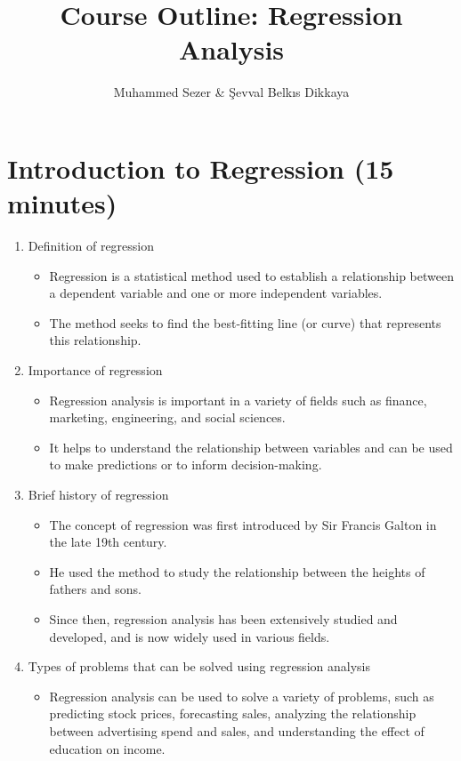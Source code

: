 \documentclass{article}
\begin{document}
\title{Course Outline: Regression Analysis}
\author{Muhammed Sezer \& Şevval Belkıs Dikkaya}
\date{}

\maketitle

\section{Introduction to Regression (15 minutes)}
\begin{enumerate}[label=\alph*)]
\item Definition of regression
\begin{itemize}
\item Regression is a statistical method used to establish a relationship between a dependent variable and one or more independent variables.
\item The method seeks to find the best-fitting line (or curve) that represents this relationship.
\end{itemize}

\item Importance of regression
\begin{itemize}
\item Regression analysis is important in a variety of fields such as finance, marketing, engineering, and social sciences.
\item It helps to understand the relationship between variables and can be used to make predictions or to inform decision-making.
\end{itemize}

\item Brief history of regression
\begin{itemize}
\item The concept of regression was first introduced by Sir Francis Galton in the late 19th century.
\item He used the method to study the relationship between the heights of fathers and sons.
\item Since then, regression analysis has been extensively studied and developed, and is now widely used in various fields.
\end{itemize}

\item Types of problems that can be solved using regression analysis
\begin{itemize}
\item Regression analysis can be used to solve a variety of problems, such as predicting stock prices, forecasting sales, analyzing the relationship between advertising spend and sales, and understanding the effect of education on income.
\end{itemize}


\end{enumerate}
\end{document}
